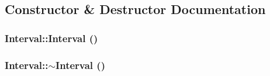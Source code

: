 \subsection{Constructor \& Destructor Documentation}
\hypertarget{class_robot_model_1_1_interval_ae48b9a9e9f672f81977627b609e32429}{
\subsubsection[{Interval}]{\setlength{\rightskip}{0pt plus 5cm}Interval::Interval ()}}
\label{class_robot_model_1_1_interval_ae48b9a9e9f672f81977627b609e32429}
\hypertarget{class_robot_model_1_1_interval_a923e1717a3dedfe1ba90f81fcb26d5c5}{
\subsubsection[{$\sim$Interval}]{\setlength{\rightskip}{0pt plus 5cm}Interval::$\sim$Interval ()}}
\label{class_robot_model_1_1_interval_a923e1717a3dedfe1ba90f81fcb26d5c5}


